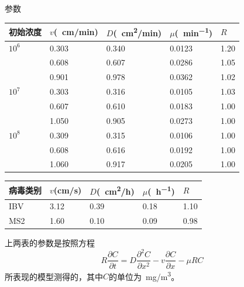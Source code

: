 \documentclass[xcolor=svgnames]{beamer} %
\begin{document}
	\begin{frame}{参数}
	\centering
	\begin{tabularx}{12cm}{XXXXX}
	\toprule
初始浓度 & $v$(\SI{}{cm/min}) & $D$(\SI{}{cm^2/min}) & $\mu$(\SI{}	{min^{-1}}) & $R$\\
	\midrule
$10^6$	&	0.303	&	0.340	&	0.0123	&	1.20 \\
		&	0.608	&	0.607	&	0.0286	&	1.05 \\
		&	0.901	&	0.978	&	0.0362	&	1.02 \\
$10^7$	&	0.303	&	0.316	&	0.0105	&	1.03 \\
		&	0.607	&	0.610	&	0.0183	&	1.00 \\
		&	1.050	&	0.905	&	0.0273	&	1.00 \\
$10^8$	&	0.309	&	0.315	&	0.0106	&	1.00 \\
		&	0.608	&	0.616	&	0.0192	&	1.00 \\
		&	1.060	&	0.917	&	0.0205	&	1.00 \\
	\bottomrule
	\end{tabularx}\end{frame}
	\begin{frame}
	\begin{center}
	\begin{tabularx}{12cm}{XXXXX}
\toprule
病毒类别 & $v$(cm/s) & $D$(\SI{}{cm^2/h}) & $\mu$(\SI{}{h^{-1}}) & $R$\\
\midrule
IBV		& 3.12	& 0.39	&	0.18	&	1.10	\\
MS2		& 1.60	& 0.10	&	0.09	&	0.98	\\
\bottomrule
\end{tabularx}
	\end{center}\par
	上两表的参数是按照方程
\begin{equation}\label{equ:canshuf}
	R\dfrac{\partial C}{\partial t} = D\dfrac{\partial^2 C}{\partial x^2}-v\dfrac{\partial C}{\partial x}-\mu RC
\end{equation}
所表现的模型测得的，其中$C$的单位为\SI{}{mg/m^3}。
	\end{frame}
\end{document}
